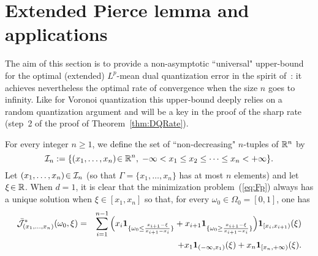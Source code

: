 
\section{Extended Pierce lemma and applications}\label{Pierce}

The aim of this section is to provide a non-asymptotic ``universal" upper-bound for the optimal  (extended) $L^p$-mean 
dual quantization error in the spirit of~\cite{pierce}: it achieves nevertheless the optimal rate of convergence when the size $n$
goes to infinity.
Like for  Voronoi quantization this upper-bound deeply relies on a
random quantization argument and will be a key in the proof of the sharp rate (step~2 of the proof of Theorem~\ref{thm:DQRate}).

For every integer $n\ge 1$, we define the set of ``non-decreasing" $n$-tuples of
$\mathbb{R}^n$ by
\[ {\cal I}_n := \{(x_1,\ldots,x_n)\!\in \mathbb{R}^n,\; -\infty<x_1\le
x_2\le\cdots\le x_n<+\infty\}.
\] 
Let $(x_1,\ldots,x_n)\!\in {\cal I}_n$ (so that $\Gamma=\{x_1,\ldots, x_n\}$ has at most $n$ elements) and  let $\xi\!\in \mathbb{R}$. When $d=1$, it is clear that  the minimization problem~(\ref{eq:Fp}) always
 has a unique solution when $\xi\!\in [x_1,x_n]$ so that, for every $\omega_0\!\in  \Omega_0=[0,1]$, one has 
\begin{eqnarray*}
{\cal \bar J}^*_{(x_1,\ldots,x_n)}(\omega_0,\xi)&=&
\sum_{i=1}^{n-1}\Big(x_i\mbox{\bf 1}_{\{\omega_0 \le \frac{x_{i+1}-\xi}{x_{i+1}-x_i}\}} 
+x_{i+1}\mbox{\bf 1}_{\{\omega_0\ge  \frac{x_{i+1}-\xi}{x_{i+1}-x_i}\}}\Big) \mbox{\bf 1}_{[x_i,x_{i+1})}(\xi)\\
&& +x_1\mbox{\bf 1}_{(-\infty,x_1)}(\xi)+x_n  \mbox{\bf 1}_{[
x_n,+\infty)}(\xi).
\end{eqnarray*}

